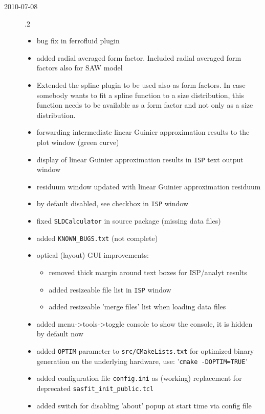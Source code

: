 \begin{description}
    \item[2010-07-08] .2
        \begin{itemize}
        \item bug fix in ferrofluid plugin
        \item added radial averaged form factor. Included radial averaged form factors also for SAW model
        \item Extended the spline plugin to be used also as form factors. In case somebody wants to fit a spline function to a size distribution, this function needs to be available as a form factor and not only as a size distribution.
        \item forwarding intermediate linear Guinier approximation results to the plot window (green curve)
        \item display of linear Guinier approximation results in \texttt{ISP} text output window
        \item residuum window updated with linear Guinier approximation residuum
        \item by default disabled, see checkbox in \texttt{ISP} window
        \item fixed \texttt{SLDCalculator} in source package (missing data files)
        \item added \texttt{KNOWN\_BUGS.txt} (not complete)
        \item optical (layout) GUI improvements:
            \begin{itemize}
            \item removed thick margin around text boxes for ISP/analyt results
            \item added resizeable file list in \texttt{ISP} window
            \item added resizeable 'merge files' list when loading data files
            \end{itemize}
        \item added menu->tools->toggle console to show the console, it is hidden by default now
        \item added \texttt{OPTIM} parameter to \texttt{src/CMakeLists.txt} for optimized binary generation on the underlying hardware, use: '\texttt{cmake -DOPTIM=TRUE}'
        \item added configuration file \texttt{config.ini} as (working) replacement for deprecated \texttt{sasfit\_init\_public.tcl}
        \item added switch for disabling 'about' popup at start time via config file

\end{itemize}
\end{description}
